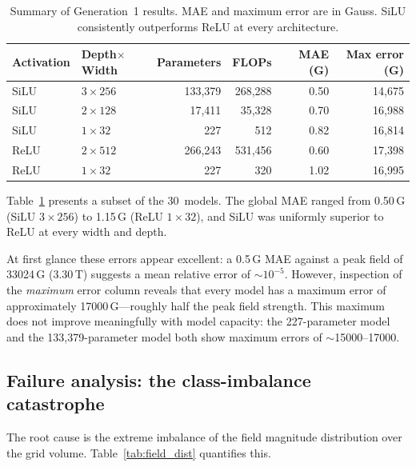 \documentclass[11pt,a4paper]{article}
\newcommand{\SI}[2]{#1\,#2}
\begin{document}
\begin{table}[t]
    \centering
    \caption{Summary of Generation~1 results.  MAE and maximum error are
    in Gauss.  SiLU consistently outperforms ReLU at every architecture.}
    \label{tab:gen1_summary}
    \begin{tabular}{llrrrr}
        \toprule
        Activation & Depth$\times$Width & Parameters & FLOPs &
        MAE (G) & Max error (G) \\
        \midrule
        SiLU & $3 \times 256$ & 133{,}379 & 268{,}288 & 0.50 & 14{,}675 \\
        SiLU & $2 \times 128$ &  17{,}411 &  35{,}328 & 0.70 & 16{,}988 \\
        SiLU & $1 \times 32$  &     227   &     512   & 0.82 & 16{,}814 \\
        ReLU & $2 \times 512$ & 266{,}243 & 531{,}456 & 0.60 & 17{,}398 \\
        ReLU & $1 \times 32$  &     227   &     320   & 1.02 & 16{,}995 \\
        \bottomrule
    \end{tabular}
\end{table}

Table~\ref{tab:gen1_summary} presents a subset of the 30~models.
The global MAE ranged from \SI{0.50}{G} (SiLU $3{\times}256$) to
\SI{1.15}{G} (ReLU $1{\times}32$), and SiLU was uniformly superior to
ReLU at every width and depth.

At first glance these errors appear excellent: a \SI{0.5}{G} MAE
against a peak field of \SI{33024}{G} (\SI{3.30}{T}) suggests a mean
relative error of $\sim 10^{-5}$.  However, inspection of the
\emph{maximum} error column reveals that every model has a maximum
error of approximately \SI{17000}{G}---roughly half the peak field
strength.  This maximum does not improve meaningfully with model
capacity: the 227-parameter model and the 133{,}379-parameter model
both show maximum errors of $\sim$\num{15000}--\num{17000}\;.

\subsection{Failure analysis: the class-imbalance catastrophe}
\label{sec:failure}

The root cause is the extreme imbalance of the field magnitude
distribution over the grid volume.  Table~\ref{tab:field_dist} quantifies
this.
\end{document}
